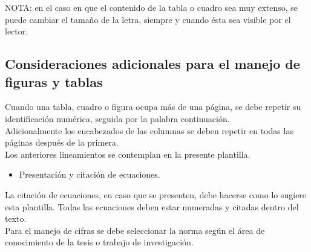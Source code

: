 NOTA: en el caso en que el contenido de la tabla o cuadro sea muy extenso, se puede cambiar el tamaño de la letra, siempre y cuando ésta sea visible por el lector.\\

\subsection{Consideraciones adicionales para el manejo de figuras y tablas}
Cuando una tabla, cuadro o figura ocupa más de una página, se debe repetir su identificación numérica, seguida por la palabra continuación.\\

Adicionalmente los encabezados de las columnas se deben repetir en todas las páginas después de la primera.\\

Los anteriores lineamientos se contemplan en la presente plantilla.\\

\begin{itemize}
\item Presentación y citación de ecuaciones.
\end{itemize}

La citación de ecuaciones, en caso que se presenten, debe hacerse como lo sugiere esta plantilla. Todas las ecuaciones deben estar numeradas y citadas dentro del texto.\\

Para el manejo de cifras se debe seleccionar la norma según el área de conocimiento de la tesis  o trabajo de investigación.\\